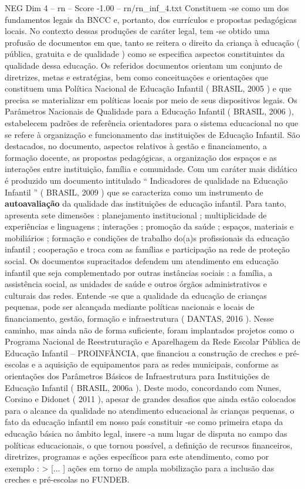 \begin{textsample}{NEG Dim 4 – rn – Score -1.00 – rn/rn\_inf\_4.txt}
Constituem -se como um dos fundamentos legais da BNCC e, portanto, dos currículos e propostas pedagógicas locais.
No contexto dessas produções de caráter legal, tem -se obtido uma profusão de documentos em que, tanto se reitera o direito da criança à educação ( pública, gratuita e de qualidade ) como se especifica aspectos constituintes da qualidade dessa educação.
Os referidos documentos orientam um conjunto de diretrizes, metas e estratégias, bem como conceituações e orientações que constituem uma Política Nacional de Educação Infantil ( BRASIL, 2005 ) e que precisa se materializar em políticas locais por meio de seus dispositivos legais.
Os Parâmetros Nacionais de Qualidade para a Educação Infantil ( BRASIL, 2006 ), estabelecem padrões de referência orientadores para o sistema educacional no que se refere à organização e funcionamento das instituições de Educação Infantil.
São destacados, no documento, aspectos relativos à gestão e financiamento, a formação docente, as propostas pedagógicas, a organização dos espaços e as interações entre instituição, família e comunidade.
Com um caráter mais didático é produzido um documento intitulado “ Indicadores de qualidade na Educação Infantil ” ( BRASIL, 2009 ) que se caracteriza como um instrumento de \textbf{autoavaliação} da qualidade das instituições de educação infantil.
Para tanto, apresenta sete dimensões : planejamento institucional ; multiplicidade de experiências e linguagens ; interações ; promoção da saúde ; espaços, materiais e mobiliários ; formação e condições de trabalho do(a)s profissionais da educação infantil ; cooperação e troca com as famílias e participação na rede de proteção social.
Os documentos supracitados defendem um atendimento em educação infantil que seja complementado por outras instâncias sociais : a família, a assistência social, as unidades de saúde e outros órgãos administrativos e culturais das redes.
Entende -se que a qualidade da educação de crianças pequenas, pode ser alcançada mediante políticas nacionais e locais de financiamento, gestão, formação e infraestrutura ( DANTAS, 2016 ).
Nesse caminho, mas ainda não de forma suficiente, foram implantados projetos como o Programa Nacional de Reestruturação e Aparelhagem da Rede Escolar Pública de Educação Infantil – PROINFÂNCIA, que financiou a construção de creches e pré-escolas e a aquisição de equipamentos para as redes municipais, conforme as orientações dos Parâmetros Básicos de Infraestrutura para Instituições de Educação Infantil ( BRASIL, 2006a ).
Deste modo, concordando com Nunes, Corsino e Didonet ( 2011 ), apesar de grandes desafios que ainda estão colocados para o alcance da qualidade no atendimento educacional às crianças pequenas, o fato da educação infantil em nosso país constituir -se como primeira etapa da educação básica no âmbito legal, insere -a num lugar de disputa no campo das políticas educacionais, o que tornou possível, a definição de recursos financeiros, diretrizes, programas e ações específicos para este atendimento, como por exemplo : > [... ] ações em torno de ampla mobilização para a inclusão das creches e pré-escolas no FUNDEB.

\end{textsample}
